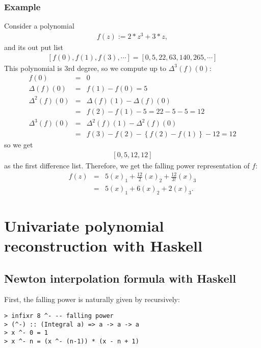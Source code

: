 \documentclass[11pt]{book}
\begin{document}
\subsubsection{Example}
Consider a polynomial
\begin{eqnarray}
f(z) := 2*z^3+3*z,
\end{eqnarray}
and its out put list
\begin{eqnarray}
\left[ f(0), f(1), f(3), \cdots\right] = \left[0,5,22,63,140,265, \cdots \right]
\end{eqnarray}
This polynomial is 3rd degree, so we compute up to $\Delta^3(f)(0)$:
\begin{eqnarray}
f(0) &=& 0 \\
\Delta(f)(0) &=& f(1) - f(0) = 5\\
\nonumber
\Delta^2(f)(0) &=& \Delta(f)(1) - \Delta(f)(0) \\
&=& f(2) - f(1) - 5 = 22 -5 -5= 12 \\
\nonumber
\Delta^3(f)(0) &=& \Delta^2(f)(1) - \Delta^2(f)(0) \\
&=& f(3)-f(2) - \left\{ f(2) - f(1)\right\} - 12 = 12
\end{eqnarray}
so we get
\begin{eqnarray}
\label{exOfDiff}
\left[0,5,12,12\right]
\end{eqnarray}
as the first difference list.
Therefore, we get the falling power representation of $f$:
\begin{eqnarray}
f(z) &=& 5(x)_1 + \frac{12}{2}(x)_2 + \frac{12}{3!}(x)_3 \\
\label{exOfNewton} &=&  5(x)_1 + 6(x)_2 + 2(x)_3.
\end{eqnarray}

\section{Univariate polynomial reconstruction with Haskell}
\subsection{Newton interpolation formula with Haskell}
First, the falling power is naturally given by recursively:
\begin{verbatim}
> infixr 8 ^- -- falling power
> (^-) :: (Integral a) => a -> a -> a
> x ^- 0 = 1
> x ^- n = (x ^- (n-1)) * (x - n + 1)
\end{verbatim}
\end{document}
